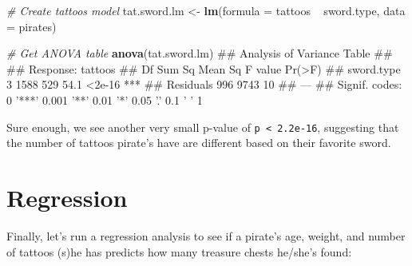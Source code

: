 \documentclass[]{book}
\newenvironment{Shaded}{\begin{snugshade}}{\end{snugshade}}
\newcommand{\KeywordTok}[1]{\textcolor[rgb]{0.13,0.29,0.53}{\textbf{{#1}}}}
\newcommand{\DataTypeTok}[1]{\textcolor[rgb]{0.13,0.29,0.53}{{#1}}}
\newcommand{\StringTok}[1]{\textcolor[rgb]{0.31,0.60,0.02}{{#1}}}
\newcommand{\CommentTok}[1]{\textcolor[rgb]{0.56,0.35,0.01}{\textit{{#1}}}}
\newcommand{\NormalTok}[1]{{#1}}
\theoremstyle{definition}
\theoremstyle{definition}
\theoremstyle{remark}
\begin{document}
\begin{Shaded}
\begin{Highlighting}[]
\CommentTok{# Create tattoos model}
\NormalTok{tat.sword.lm <-}\StringTok{ }\KeywordTok{lm}\NormalTok{(}\DataTypeTok{formula =} \NormalTok{tattoos ~}\StringTok{ }\NormalTok{sword.type,}
                   \DataTypeTok{data =} \NormalTok{pirates)}

\CommentTok{# Get ANOVA table}
\KeywordTok{anova}\NormalTok{(tat.sword.lm)}
\NormalTok{## Analysis of Variance Table}
\NormalTok{## }
\NormalTok{## Response: tattoos}
\NormalTok{##             Df Sum Sq Mean Sq F value Pr(>F)    }
\NormalTok{## sword.type   3   1588     529    54.1 <2e-16 ***}
\NormalTok{## Residuals  996   9743      10                   }
\NormalTok{## ---}
\NormalTok{## Signif. codes:  0 '***' 0.001 '**' 0.01 '*' 0.05 '.' 0.1 ' ' 1}
\end{Highlighting}
\end{Shaded}

Sure enough, we see another very small p-value of
\texttt{p\ \textless{}\ 2.2e-16}, suggesting that the number of tattoos
pirate's have are different based on their favorite sword.

\section{Regression}\label{regression}

Finally, let's run a regression analysis to see if a pirate's age,
weight, and number of tattoos (s)he has predicts how many treasure
chests he/she's found:
\end{document}

